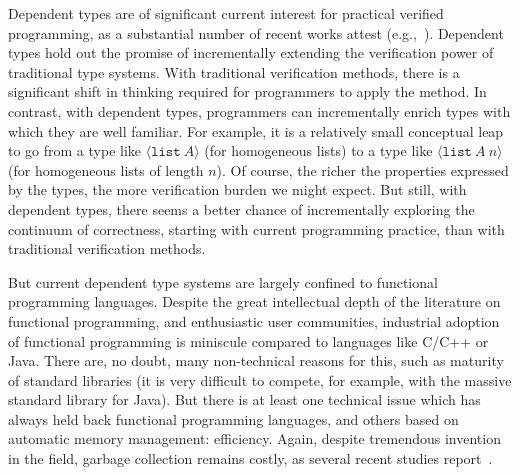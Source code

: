 \documentclass[9pt,natbib]{sigplanconf}
\begin{document}
Dependent types are of significant current interest for practical
verified programming, as a substantial number of recent works attest
(e.g.,~\cite{oury+08,norell07,pasalic+07,sheard06,nanevski+08,licata+05,chenxi05}).
Dependent types hold out the promise of incrementally extending the
verification power of traditional type systems.  With traditional
verification methods, there is a significant shift in thinking
required for programmers to apply the method.
In contrast, with dependent types, programmers can incrementally
enrich types with which they are well familiar.  For example, it is a
relatively small conceptual leap to go from a type like $\langle
\texttt{list}\ A\rangle$ (for homogeneous lists) to a type like
$\langle \texttt{list}\ A\ n\rangle$ (for homogeneous lists of length
$n$).  Of course, the richer the properties expressed by the types,
the more verification burden we might expect.  But still, with
dependent types, there seems a better chance of incrementally
exploring the continuum of correctness, starting with current
programming practice, than with traditional verification methods.

But current dependent type systems are largely confined to functional
programming languages.  Despite the great intellectual depth of the
literature on functional programming, and enthusiastic user
communities, industrial adoption of functional programming is
miniscule compared to languages like C/C++ or Java.  There are, no
doubt, many non-technical reasons for this, such as maturity of
standard libraries (it is very difficult to compete, for example, with
the massive standard library for Java).  But there is at least one
technical issue which has always held back functional programming
languages, and others based on automatic memory management:
efficiency.  Again, despite tremendous invention in the field, garbage
collection remains costly, as several recent studies
report~\cite{Xian2008,hertz+05}.
\end{document}
